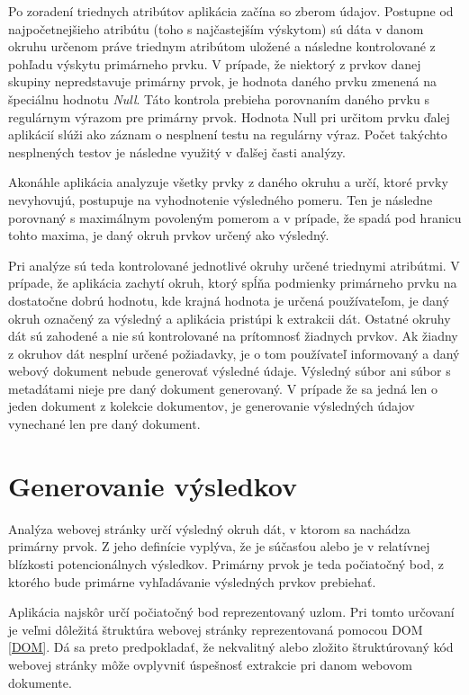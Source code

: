 Po zoradení triednych atribútov aplikácia začína so zberom údajov. Postupne od najpočetnejšieho atribútu (toho s najčastejším výskytom) sú dáta v danom okruhu určenom práve triednym atribútom uložené a následne kontrolované z pohľadu výskytu primárneho prvku. V prípade, že niektorý z prvkov danej skupiny nepredstavuje primárny prvok, je hodnota daného prvku zmenená na špeciálnu hodnotu \textit{Null}. Táto kontrola prebieha porovnaním daného prvku s regulárnym výrazom pre primárny prvok. Hodnota Null pri určitom prvku ďalej aplikácií slúži ako záznam o nesplnení testu na regulárny výraz. Počet takýchto nesplnených testov je následne využitý v ďalšej časti analýzy.

Akonáhle aplikácia analyzuje všetky prvky z daného okruhu a určí, ktoré prvky nevyhovujú, postupuje na vyhodnotenie výsledného pomeru. Ten je následne porovnaný s maximálnym povoleným pomerom a v prípade, že spadá pod hranicu tohto maxima, je daný okruh prvkov určený ako výsledný.

\bigskip

Pri analýze sú teda kontrolované jednotlivé okruhy určené triednymi atribútmi. V prípade, že aplikácia zachytí okruh, ktorý spĺňa podmienky primárneho prvku na dostatočne dobrú hodnotu, kde krajná hodnota je určená používateľom, je daný okruh označený za výsledný a aplikácia pristúpi k extrakcii dát. Ostatné okruhy dát sú zahodené a nie sú kontrolované na prítomnosť žiadnych prvkov. Ak žiadny z okruhov dát nesplní určené požiadavky, je o tom používateľ informovaný a daný webový dokument nebude generovať výsledné údaje. Výsledný súbor ani súbor s metadátami nieje pre daný dokument generovaný. V prípade že sa jedná len o jeden dokument z kolekcie dokumentov, je generovanie výsledných údajov vynechané len pre daný dokument.

\newpage

\section{Generovanie výsledkov}

Analýza webovej stránky určí výsledný okruh dát, v ktorom sa nachádza primárny prvok. Z jeho definície vyplýva, že je súčasťou alebo je v relatívnej blízkosti potencionálnych výsledkov. Primárny prvok je teda počiatočný bod, z ktorého bude primárne vyhľadávanie výsledných prvkov prebiehať. 

Aplikácia najskôr určí počiatočný bod reprezentovaný uzlom. Pri tomto určovaní je veľmi dôležitá štruktúra webovej stránky reprezentovaná pomocou DOM \ref{DOM}. Dá sa preto predpokladať, že nekvalitný alebo zložito štruktúrovaný kód webovej stránky môže ovplyvniť úspešnosť extrakcie pri danom webovom dokumente. 

